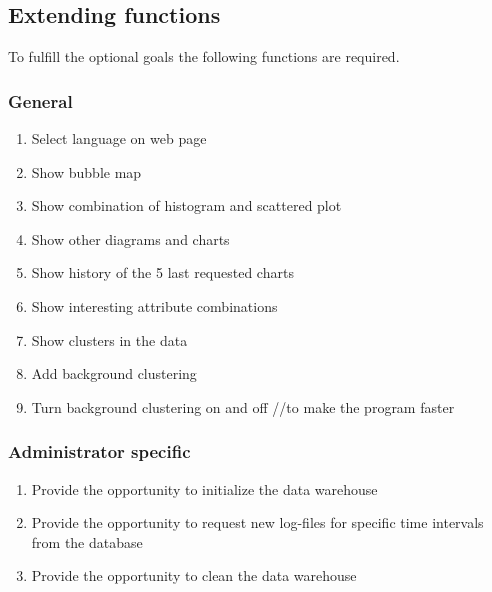 \subsection{Extending functions}

To fulfill the optional goals the following functions are required.

\subsubsection*{General}
\begin{enumerate}[resume]
  
  \item Select language on web page \label{f22}
  
  \item Show bubble map \label{f23} %
  
  \item Show combination of histogram and scattered plot \label{f24}
  
  \item Show other diagrams and charts \label{f25}
  
  \item Show history of the 5 last requested charts \label{f26}
  \item Show interesting attribute combinations

  \item Show clusters in the data
  
  \item Add background clustering
  
  \item Turn background clustering on and off //to make the program faster


 
\end{enumerate}


\subsubsection*{Administrator specific}

\begin{enumerate}[resume]
   
  \item Provide the opportunity to initialize the data warehouse\label{f27}
   
  \item Provide the opportunity to request new log-files for specific time intervals
  	from the database \label{f28}
  
  \item Provide the opportunity to clean the data warehouse \label{f29}
   
\end{enumerate}



